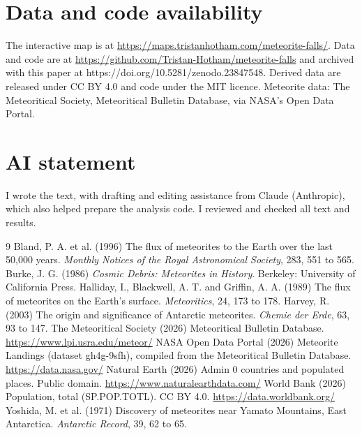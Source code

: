 \documentclass[11pt,a4paper]{article}
\begin{document}
\section*{Data and code availability}
The interactive map is at \url{https://maps.tristanhotham.com/meteorite-falls/}. Data and code are at \url{https://github.com/Tristan-Hotham/meteorite-falls} and archived with this paper at https://doi.org/10.5281/zenodo.23847548. Derived data are released under CC BY 4.0 and code under the MIT licence. Meteorite data: The Meteoritical Society, Meteoritical Bulletin Database, via NASA's Open Data Portal.

\section*{AI statement}
I wrote the text, with drafting and editing assistance from Claude (Anthropic), which also helped prepare the analysis code. I reviewed and checked all text and results.

\begin{thebibliography}{9}
 Bland, P. A. et al. (1996) The flux of meteorites to the Earth over the last 50,000 years. \emph{Monthly Notices of the Royal Astronomical Society}, 283, 551 to 565.
 Burke, J. G. (1986) \emph{Cosmic Debris: Meteorites in History}. Berkeley: University of California Press.
 Halliday, I., Blackwell, A. T. and Griffin, A. A. (1989) The flux of meteorites on the Earth's surface. \emph{Meteoritics}, 24, 173 to 178.
 Harvey, R. (2003) The origin and significance of Antarctic meteorites. \emph{Chemie der Erde}, 63, 93 to 147.
 The Meteoritical Society (2026) Meteoritical Bulletin Database. \url{https://www.lpi.usra.edu/meteor/}
 NASA Open Data Portal (2026) Meteorite Landings (dataset gh4g-9sfh), compiled from the Meteoritical Bulletin Database. \url{https://data.nasa.gov/}
 Natural Earth (2026) Admin 0 countries and populated places. Public domain. \url{https://www.naturalearthdata.com/}
 World Bank (2026) Population, total (SP.POP.TOTL). CC BY 4.0. \url{https://data.worldbank.org/}
 Yoshida, M. et al. (1971) Discovery of meteorites near Yamato Mountains, East Antarctica. \emph{Antarctic Record}, 39, 62 to 65.
\end{thebibliography}
\end{document}
